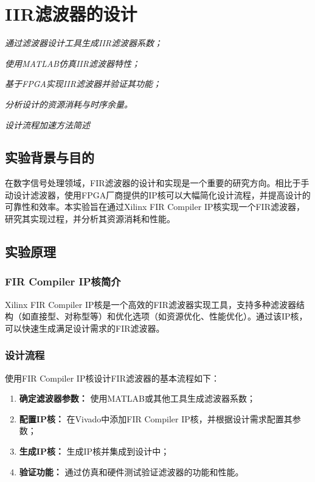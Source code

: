\chapter{IIR滤波器的设计}
\begin{introduction}
    \item \textit{通过滤波器设计工具生成IIR滤波器系数；}
    \item \textit{使用MATLAB仿真IIR滤波器特性；}
    \item \textit{基于FPGA实现IIR滤波器并验证其功能；}
    \item \textit{分析设计的资源消耗与时序余量。}
    \item \textit{设计流程加速方法简述}
\end{introduction}

\section{实验背景与目的}
在数字信号处理领域，FIR滤波器的设计和实现是一个重要的研究方向。相比于手动设计滤波器，使用FPGA厂商提供的IP核可以大幅简化设计流程，并提高设计的可靠性和效率。本实验旨在通过Xilinx FIR Compiler IP核实现一个FIR滤波器，研究其实现过程，并分析其资源消耗和性能。

\section{实验原理}
\subsection{FIR Compiler IP核简介}
Xilinx FIR Compiler IP核是一个高效的FIR滤波器实现工具，支持多种滤波器结构（如直接型、对称型等）和优化选项（如资源优化、性能优化）。通过该IP核，可以快速生成满足设计需求的FIR滤波器。

\subsection{设计流程}
使用FIR Compiler IP核设计FIR滤波器的基本流程如下：
\begin{enumerate}
    \item \textbf{确定滤波器参数：} 使用MATLAB或其他工具生成滤波器系数；
    \item \textbf{配置IP核：} 在Vivado中添加FIR Compiler IP核，并根据设计需求配置其参数；
    \item \textbf{生成IP核：} 生成IP核并集成到设计中；
    \item \textbf{验证功能：} 通过仿真和硬件测试验证滤波器的功能和性能。
\end{enumerate}
